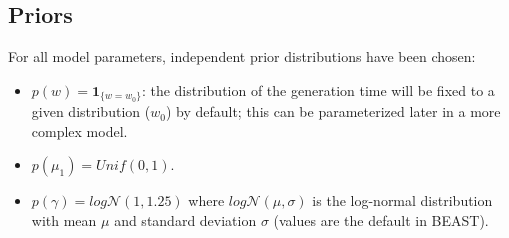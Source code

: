 \documentclass[10pt]{article}
\begin{document}
% 
\subsection*{Priors}

For all model parameters, independent prior distributions have been chosen:
\begin{itemize}
	\item $p(w) = \mathbf{1}_{\{w=w_0\}}$: the distribution of the generation time will be fixed to a given distribution ($w_0$) by default; this can be parameterized later in a more complex model.
	\item $p(\mu_1) = Unif(0,1)$.
	\item $p(\gamma) = log\mathcal{N}(1,1.25)$ where $log\mathcal{N}(\mu,\sigma)$ is the log-normal distribution with mean $\mu$ and standard deviation $\sigma$ (values are the default in BEAST).
\end{itemize}


\end{document}
